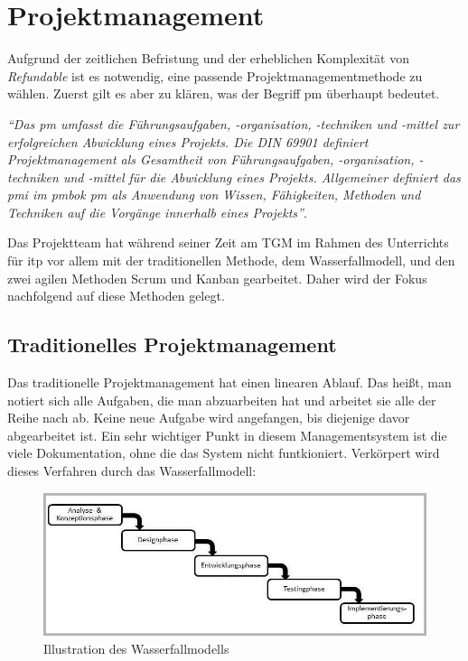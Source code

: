 \chapter{Projektmanagement}
Aufgrund der zeitlichen Befristung und der erheblichen Komplexität von \textit{Refundable} ist es notwendig, eine passende Projektmanagementmethode zu wählen. Zuerst gilt es aber zu klären, was der Begriff \Gls{pm} überhaupt bedeutet.\\
\begin{center}
	\textit{\enquote{Das \Gls{pm} umfasst die Führungsaufgaben, -organisation, -techniken und -mittel zur erfolgreichen Abwicklung eines Projekts. Die DIN 69901 definiert Projektmanagement als Gesamtheit von Führungsaufgaben, -organisation, -techniken und -mittel für die Abwicklung eines Projekts. Allgemeiner definiert das \Gls{pmi} im \Gls{pmbok} \Gls{pm} als Anwendung von Wissen, Fähigkeiten, Methoden und Techniken auf die Vorgänge innerhalb eines Projekts}}\cite{pm-definition}.
\end{center}
Das Projektteam hat während seiner Zeit am TGM im Rahmen des Unterrichts für \Gls{itp} vor allem mit der traditionellen Methode, dem Wasserfallmodell, und den zwei agilen Methoden Scrum und Kanban gearbeitet. Daher wird der Fokus nachfolgend auf diese Methoden gelegt.
\newpage
\section{Traditionelles Projektmanagement}
\label{chapter:tradi-pm}
Das traditionelle Projektmanagement hat einen linearen Ablauf. Das heißt, man notiert sich alle Aufgaben, die man abzuarbeiten hat und arbeitet sie alle der Reihe nach ab. Keine neue Aufgabe wird angefangen, bis diejenige davor abgearbeitet ist. Ein sehr wichtiger Punkt in diesem Managementsystem ist die viele Dokumentation, ohne die das System nicht funtkioniert. Verkörpert wird dieses Verfahren durch das Wasserfallmodell:
\begin{figure}[H]
	\centering
	\includegraphics[width=0.7\linewidth]{images/projektmanagement/wasserfallmodell}
	\caption[Wasserfallmodell]{Illustration des Wasserfallmodells \cite{pm-wasserfall-online}}
	\label{fig:wasserfall}
\end{figure}
